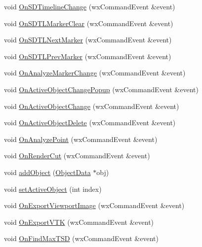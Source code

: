\begin{DoxyCompactItemize}
\item 
void \hyperlink{classGUIMainWindow_a791d688a11d58c514ca4a892f2b69b07}{On\-S\-D\-Timeline\-Change} (wx\-Command\-Event \&event)
\item 
void \hyperlink{classGUIMainWindow_a8fe683ef74029b5b22d7d7cdea4f46f5}{On\-S\-D\-T\-L\-Marker\-Clear} (wx\-Command\-Event \&event)
\item 
void \hyperlink{classGUIMainWindow_a683581567b0fd6fbd8e84b160a81aac7}{On\-S\-D\-T\-L\-Next\-Marker} (wx\-Command\-Event \&event)
\item 
void \hyperlink{classGUIMainWindow_ab41592f7f45ab81dd3a1b663b18ece50}{On\-S\-D\-T\-L\-Prev\-Marker} (wx\-Command\-Event \&event)
\item 
void \hyperlink{classGUIMainWindow_a3a01e75c9362861eb9fdacb0b27643e5}{On\-Analyze\-Marker\-Change} (wx\-Command\-Event \&event)
\item 
void \hyperlink{classGUIMainWindow_a868b65c50e42965818ceb61a5e84f687}{On\-Active\-Object\-Change\-Popup} (wx\-Command\-Event \&event)
\item 
void \hyperlink{classGUIMainWindow_a62a20086c62508c133a2ac8a0496e543}{On\-Active\-Object\-Change} (wx\-Command\-Event \&event)
\item 
void \hyperlink{classGUIMainWindow_a1bc00767853df9d7b839529ce722fcb1}{On\-Active\-Object\-Delete} (wx\-Command\-Event \&event)
\item 
void \hyperlink{classGUIMainWindow_a5e4e41a749453fae5d9e1714203c3d5f}{On\-Analyze\-Point} (wx\-Command\-Event \&event)
\item 
void \hyperlink{classGUIMainWindow_a08089b067f803799204bbc1ca81230ac}{On\-Render\-Cut} (wx\-Command\-Event \&event)
\item 
void \hyperlink{classGUIMainWindow_abaec210619095a00227277b8e0434a8d}{add\-Object} (\hyperlink{classObjectData}{Object\-Data} $\ast$obj)
\item 
void \hyperlink{classGUIMainWindow_a84b96a8b25d748985f4960326a977b22}{set\-Active\-Object} (int index)
\item 
void \hyperlink{classGUIMainWindow_a9199006080109ef0235dacfc83456338}{On\-Export\-Viewport\-Image} (wx\-Command\-Event \&event)
\item 
void \hyperlink{classGUIMainWindow_a48b4417c2eaa97a6eea4438f67a315e7}{On\-Export\-V\-T\-K} (wx\-Command\-Event \&event)
\item 
void \hyperlink{classGUIMainWindow_af21ea342f481cfdd01ed04005f903ad5}{On\-Find\-Max\-T\-S\-D} (wx\-Command\-Event \&event)
\item 

\end{DoxyCompactItemize}
